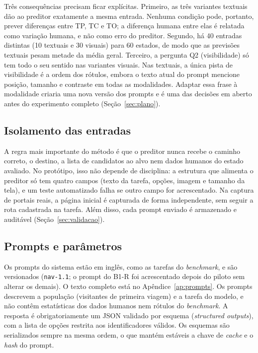 \documentclass[12pt,oneside,a4paper,chapter=TITLE,english,brazil]{abntex2}
\newcommand{\code}[1]{\texttt{#1}}
\begin{document}
Três consequências precisam ficar explícitas. Primeiro, as três variantes textuais dão ao preditor exatamente a mesma entrada. Nenhuma condição pode, portanto, prever diferenças entre TP, TC e TO; a diferença humana entre elas é relatada como variação humana, e não como erro do preditor. Segundo, há 40 entradas distintas (10 textuais e 30 visuais) para 60 estados, de modo que as previsões textuais pesam metade da média geral. Terceiro, a pergunta Q2 (visibilidade) só tem todo o seu sentido nas variantes visuais. Nas textuais, a única pista de visibilidade é a ordem dos rótulos, embora o texto atual do prompt mencione posição, tamanho e contraste em todas as modalidades. Adaptar essa frase à modalidade criaria uma nova versão dos prompts e é uma das decisões em aberto antes do experimento completo (Seção~\ref{sec:plano}).

\subsection{Isolamento das entradas}
\label{sec:isolamento}

A regra mais importante do método é que o preditor nunca recebe o caminho correto, o destino, a lista de candidatos ao alvo nem dados humanos do estado avaliado. No protótipo, isso não depende de disciplina: a estrutura que alimenta o preditor só tem quatro campos (texto da tarefa, opções, imagem e tamanho da tela), e um teste automatizado falha se outro campo for acrescentado. Na captura de portais reais, a página inicial é capturada de forma independente, sem seguir a rota cadastrada na tarefa. Além disso, cada prompt enviado é armazenado e auditável (Seção~\ref{sec:validacao}).

\subsection{Prompts e parâmetros}
\label{sec:prompts}

Os prompts do sistema estão em inglês, como as tarefas do \textit{benchmark}, e são versionados (\code{nav-1.1}; o prompt do B1-R foi acrescentado depois do piloto sem alterar os demais). O texto completo está no Apêndice~\ref{ap:prompts}. Os prompts descrevem a população (visitantes de primeira viagem) e a tarefa do modelo, e não contêm estatísticas dos dados humanos nem rótulos do \textit{benchmark}. A resposta é obrigatoriamente um JSON validado por esquema (\textit{structured outputs}), com a lista de opções restrita aos identificadores válidos. Os esquemas são serializados sempre na mesma ordem, o que mantém estáveis a chave de \textit{cache} e o \textit{hash} do prompt.
\end{document}
